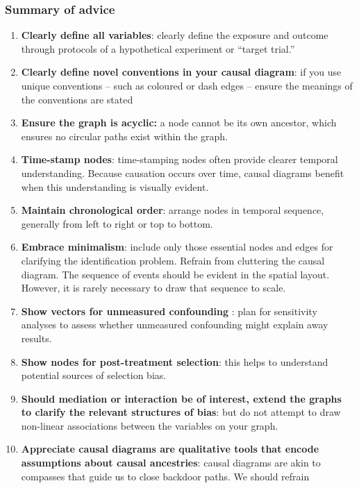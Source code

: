 \documentclass[
  singlecolumn]{article}
\begin{document}
\hypertarget{summary-of-advice}{%
\subsubsection{Summary of advice}\label{summary-of-advice}}

\begin{enumerate}
\def\labelenumi{\arabic{enumi}.}
\item
  \textbf{Clearly define all variables}: clearly define the exposure and
  outcome through protocols of a hypothetical experiment or ``target
  trial.''
\item
  \textbf{Clearly define novel conventions in your causal diagram}: if
  you use unique conventions -- such as coloured or dash edges -- ensure
  the meanings of the conventions are stated
\item
  \textbf{Ensure the graph is acyclic:} a node cannot be its own
  ancestor, which ensures no circular paths exist within the graph.
\item
  \textbf{Time-stamp nodes}: time-stamping nodes often provide clearer
  temporal understanding. Because causation occurs over time, causal
  diagrams benefit when this understanding is visually evident.
\item
  \textbf{Maintain chronological order}: arrange nodes in temporal
  sequence, generally from left to right or top to bottom.
\item
  \textbf{Embrace minimalism}: include only those essential nodes and
  edges for clarifying the identification problem. Refrain from
  cluttering the causal diagram. The sequence of events should be
  evident in the spatial layout. However, it is rarely necessary to draw
  that sequence to scale.
\item
  \textbf{Show vectors for unmeasured confounding} : plan for
  sensitivity analyses to assess whether unmeasured confounding might
  explain away results.
\item
  \textbf{Show nodes for post-treatment selection}: this helps to
  understand potential sources of selection bias.
\item
  \textbf{Should mediation or interaction be of interest, extend the
  graphs to clarify the relevant structures of bias}: but do not attempt
  to draw non-linear associations between the variables on your graph.
\item
  \textbf{Appreciate causal diagrams are qualitative tools that encode
  assumptions about causal ancestries}: causal diagrams are akin to
  compasses that guide us to close backdoor paths. We should refrain

\end{enumerate}
\end{document}
